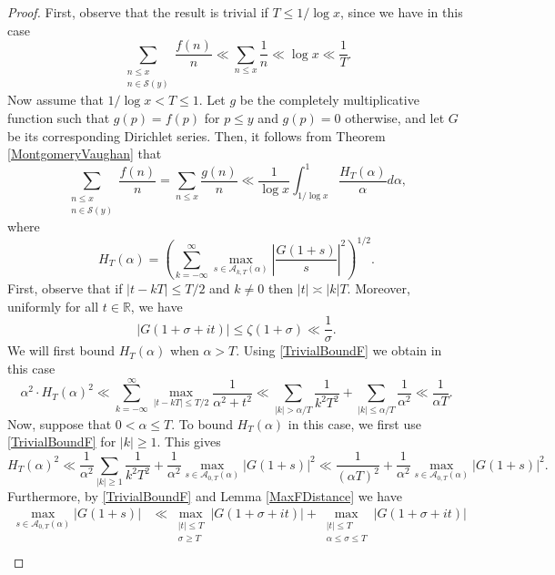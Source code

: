 \documentclass[12pt]{amsart}
\theoremstyle{definition}
\numberwithin{equation}{section}
\begin{document}
\begin{proof}
First, observe that the result is trivial if $T\leq 1/\log x$, since we have in this case
$$\sum_{\substack{n\leq x\\ n\in \mathcal{S}(y)}}\frac{f(n)}{n}\ll \sum_{n\leq x}\frac{1}{n}\ll \log x\ll \frac{1}{T}.$$
Now assume that $1/\log x<T\leq 1$. Let $g$ be the completely multiplicative function such that $g(p)=f(p)$ for $p\leq y$ and $g(p) = 0$ otherwise, and let $G$ be its corresponding Dirichlet series. Then, it follows from Theorem \ref{MontgomeryVaughan} that
\begin{equation}\label{SmoothFG}
\sum_{\substack{n\leq x\\ n\in \mathcal{S}(y)}} \frac{f(n)}{n}=
\sum_{n\leq x}\frac{g(n)}{n}\ll \frac{1}{\log x}\int_{1/\log x}^1 \frac{H_{T}(\alpha)}{\alpha} d\alpha, 
\end{equation}
where 
$$
H_{T}(\alpha)=\left(\sum_{k=-\infty}^{\infty} \max_{s\in \mathcal{A}_{k, T}(\alpha)} \left|\frac{G(1+s)}{s}\right|^2\right)^{1/2}.
$$
First, observe that if $|t-kT|\leq T/2$ and $k\neq 0$ then $|t|\asymp |k|T$.  Moreover, uniformly for all $t\in \mathbb{R}$, we have 
\begin{equation}\label{TrivialBoundF}
|G(1+\sigma+it)|\leq \zeta(1+\sigma)\ll \frac{1}{\sigma}.
\end{equation}
We will first bound $H_{T}(\alpha)$ when $\alpha>T$.  Using \eqref{TrivialBoundF} we obtain in this case
\begin{equation}\label{BigAlpha}
\alpha^2 \cdot H_{T}(\alpha)^2\ll \sum_{k=-\infty}^{\infty} \max_{|t-kT|\leq T/2}\frac{1}{\alpha^2 +t^2}\ll \sum_{|k|> \alpha/T}\frac{1}{k^2T^2}+ \sum_{|k|\leq \alpha/T} \frac{1}{\alpha^2}\ll \frac{1}{\alpha T}.
\end{equation}
Now, suppose that $0<\alpha\leq T$. To bound $H_{T}(\alpha)$ in this case, we first use \eqref{TrivialBoundF} for $|k|\geq 1$. This gives
$$
H_{T}(\alpha)^2 
\ll \frac{1}{\alpha^2}\sum_{|k|\geq 1} \frac{1}{k^2T^2}+\frac{1}{\alpha^2}\max_{s\in \mathcal{A}_{0, T}(\alpha)} |G(1+s)|^2\ll \frac{1}{(\alpha T)^2}+ \frac{1}{\alpha^2}\max_{s\in \mathcal{A}_{0, T}(\alpha)} |G(1+s)|^2.
$$
Furthermore, by  \eqref{TrivialBoundF} and Lemma \ref{MaxFDistance} we have
\begin{align*}
\max_{s\in \mathcal{A}_{0, T}(\alpha)} |G(1+s)|
&\ll \max_{\substack{|t|\leq T\\ \sigma\geq T}} |G(1+\sigma+it)|+ \max_{\substack{|t|\leq T\\ \alpha \leq \sigma\leq T}} |G(1+\sigma+it)|\\

\end{align*}
\end{proof}
\end{document}
